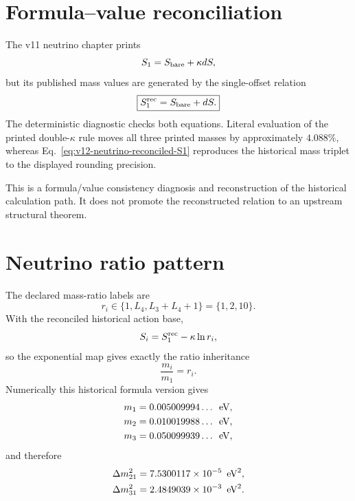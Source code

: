 \section{Formula--value reconciliation}
The v11 neutrino chapter prints
\[
S_1=S_{\rm bare}+\kappa dS,
\]
but its published mass values are generated by the single-offset relation
\begin{equation}
\boxed{
S_1^{\rm rec}=S_{\rm bare}+dS.
}
\label{eq:v12-neutrino-reconciled-S1}
\end{equation}
The deterministic diagnostic
checks both equations. Literal evaluation of the printed double-$\kappa$ rule
moves all three printed masses by approximately $4.088\%$, whereas
Eq.~\eqref{eq:v12-neutrino-reconciled-S1} reproduces the historical mass triplet
to the displayed rounding precision.

This is a formula/value consistency diagnosis and reconstruction of the
historical calculation path. It does not promote the reconstructed relation to
an upstream structural theorem.

\section{Neutrino ratio pattern}
The declared mass-ratio labels are
\begin{equation}
\boxed{
r_i\in\{1,L_4,L_3+L_4+1\}=\{1,2,10\}.
}
\label{eq:v12-neutrino-ratios}
\end{equation}
With the reconciled historical action base,
\begin{equation}
S_i=S_1^{\rm rec}-\kappa\ln r_i,
\label{eq:v12-neutrino-actions}
\end{equation}
so the exponential map gives exactly the ratio inheritance
\begin{equation}
\frac{m_i}{m_1}=r_i.
\label{eq:v12-neutrino-ratio-inheritance}
\end{equation}
Numerically this historical formula version gives
\begin{align}
m_1&=0.005009994\ldots\ \,\text{eV},\\
m_2&=0.010019988\ldots\ \,\text{eV},\\
m_3&=0.050099939\ldots\ \,\text{eV},
\end{align}
and therefore
\begin{align}
\Delta m_{21}^2
&=7.5300117\times10^{-5}\ \,\text{eV}^2,\\
\Delta m_{31}^2
&=2.4849039\times10^{-3}\ \,\text{eV}^2.
\end{align}

